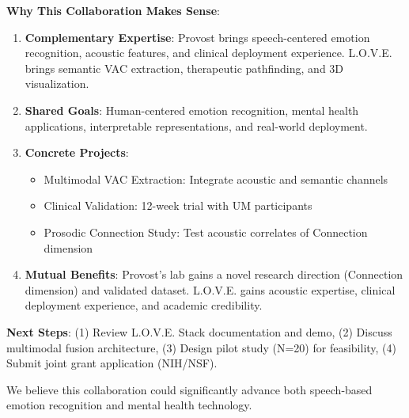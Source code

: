 \textbf{Why This Collaboration Makes Sense}:

\begin{enumerate}
    \item \textbf{Complementary Expertise}: Provost brings speech-centered emotion recognition, acoustic features, and clinical deployment experience. L.O.V.E. brings semantic VAC extraction, therapeutic pathfinding, and 3D visualization.

    \item \textbf{Shared Goals}: Human-centered emotion recognition, mental health applications, interpretable representations, and real-world deployment.

    \item \textbf{Concrete Projects}:
    \begin{itemize}
        \item Multimodal VAC Extraction: Integrate acoustic and semantic channels
        \item Clinical Validation: 12-week trial with UM participants
        \item Prosodic Connection Study: Test acoustic correlates of Connection dimension
    \end{itemize}

    \item \textbf{Mutual Benefits}: Provost's lab gains a novel research direction (Connection dimension) and validated dataset. L.O.V.E. gains acoustic expertise, clinical deployment experience, and academic credibility.
\end{enumerate}

\textbf{Next Steps}: (1) Review L.O.V.E. Stack documentation and demo, (2) Discuss multimodal fusion architecture, (3) Design pilot study (N=20) for feasibility, (4) Submit joint grant application (NIH/NSF).

We believe this collaboration could significantly advance both speech-based emotion recognition and mental health technology.
